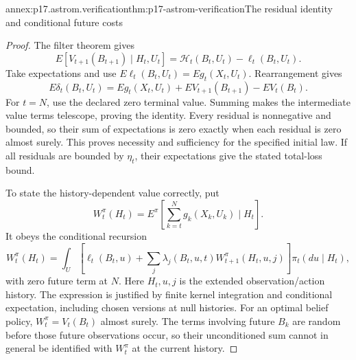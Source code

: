 \begin{annexitem}{annex:p17.astrom.verification}{thm:p17-astrom-verification}{The residual identity and conditional future costs}
\begin{proof}
The filter theorem gives
\[
 E[V_{t+1}(B_{t+1})\mid H_t,U_t]
                  =\mathcal H_t(B_t,U_t)-\ell_t(B_t,U_t).
\]
Take expectations and use
\(E\ell_t(B_t,U_t)=E g_t(X_t,U_t)\).
Rearrangement gives
\[
 E\delta_t(B_t,U_t)
   =E g_t(X_t,U_t)+E V_{t+1}(B_{t+1})-E V_t(B_t).
\]
For \(t=N\), use the declared zero terminal value.
Summing makes the intermediate value terms telescope,
proving the identity.
Every residual is nonnegative and bounded, so their
sum of expectations is zero exactly when each residual
is zero almost surely. This proves necessity and
sufficiency for the specified initial law.
If all residuals are bounded by \(\eta_t\), their
expectations give the stated total-loss bound.

To state the history-dependent value correctly, put
\[
 W_t^\pi(H_t)=
              E^\pi[\sum_{k=t}^N g_k(X_k,U_k)\mid H_t].
\]
It obeys the conditional recursion
\[
 W_t^\pi(H_t)=
  \int_U\left[\ell_t(B_t,u)+
      \sum_j\lambda_j(B_t,u,t)
        W_{t+1}^\pi(H_t,u,j)\right]\pi_t(du\mid H_t),
\]
with zero future term at \(N\).
Here \(H_t,u,j\) is the extended observation/action history.
The expression is justified by finite kernel integration
and conditional expectation, including chosen versions
at null histories. For an optimal belief policy,
\(W_t^\pi=V_t(B_t)\) almost surely.
The terms involving future \(B_k\) are random before
those future observations occur, so their unconditioned
sum cannot in general be identified with \(W_t^\pi\)
at the current history.
\end{proof}
\end{annexitem}


